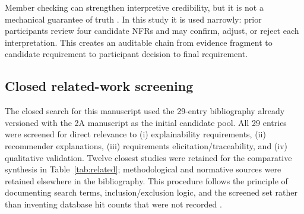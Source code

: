 \documentclass[pdflatex,sn-basic]{sn-jnl}
\begin{document}
Member checking can strengthen interpretive credibility, but it is not a mechanical guarantee of truth \cite{birt2016}. In this study it is used narrowly: prior participants review four candidate NFRs and may confirm, adjust, or reject each interpretation. This creates an auditable chain from evidence fragment to candidate requirement to participant decision to final requirement.

\subsection{Closed related-work screening}
The closed search for this manuscript used the 29-entry bibliography already versioned with the 2A manuscript as the initial candidate pool. All 29 entries were screened for direct relevance to (i) explainability requirements, (ii) recommender explanations, (iii) requirements elicitation/traceability, and (iv) qualitative validation. Twelve closest studies were retained for the comparative synthesis in Table~\ref{tab:related}; methodological and normative sources were retained elsewhere in the bibliography. This procedure follows the principle of documenting search terms, inclusion/exclusion logic, and the screened set rather than inventing database hit counts that were not recorded \cite{kitchenham2007}.
\end{document}
